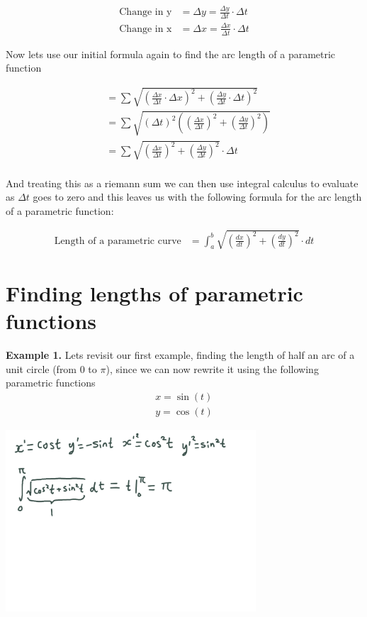 \documentclass[12pt]{extarticle}
\begin{document}
\begin{align} 
    \text{Change in y} &= \Delta y = \frac{\Delta y}{\Delta t} \cdot \Delta t \\
    \text{Change in x} &= \Delta x = \frac{\Delta x}{\Delta t} \cdot \Delta t  
\end{align}

Now lets use our initial formula again to find the arc length of a parametric function


\begin{align} 
    &= \sum \sqrt{(\frac{\Delta x}{\Delta t} \cdot \Delta x)^2 + (\frac{\Delta y}{\Delta t} \cdot \Delta t) ^ 2} \\ 
    &= \sum \sqrt{(\Delta t)^2((\frac{\Delta x}{\Delta t})^2 + (\frac{\Delta y}{\Delta t}) ^ 2)} \\ 
    &= \sum \sqrt{(\frac{\Delta x}{\Delta t})^2 + (\frac{\Delta y}{\Delta t}) ^ 2} \cdot \Delta t \\ 
\end{align}

And treating this as a riemann sum we can then use integral calculus to evaluate as $\Delta t$ goes to zero and this leaves us with the following formula for the arc length of a parametric function:

\begin{align} 
    \text{Length of a parametric curve} &= \int_{a}^{b} \sqrt{(\frac{dx}{dt})^2 + (\frac{dy}{dt}) ^ 2} \cdot dt  
\end{align}

\section{Finding lengths of parametric functions}

\textbf{Example 1.} Lets revisit our first example, finding the length of half an arc of a unit circle (from $0$ to $\pi$), since we can now rewrite it using the following parametric functions
\begin{align} 
    x = \sin(t) \\ 
    y = \cos(t) 
\end{align}

\begin{center}
    \includegraphics[width = 0.7\textwidth]{assignment0005.png}
\end{center}
\end{document}
